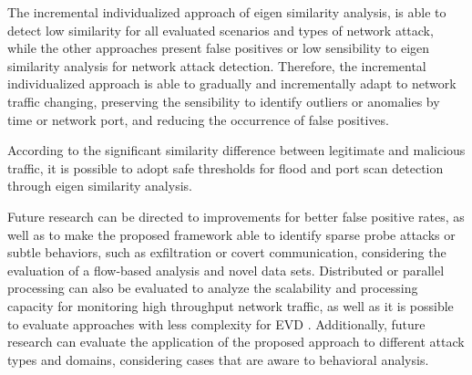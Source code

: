 The incremental individualized approach of eigen similarity analysis, is able to detect low similarity for all evaluated scenarios and types of network attack, while the other approaches present false positives or low sensibility to eigen similarity analysis for network attack detection. Therefore, the incremental individualized approach is able to gradually and incrementally adapt to network traffic changing, preserving the sensibility to identify outliers or anomalies by time or network port, and reducing the occurrence of false positives.

According to the significant similarity difference between legitimate and malicious traffic, it is possible to adopt safe thresholds for flood and port scan detection through eigen similarity analysis.

Future research can be directed to improvements for better false positive rates, as well as to make the proposed framework able to identify sparse probe attacks or subtle behaviors, such as exfiltration or covert communication, considering the evaluation of a flow-based analysis and novel data sets. Distributed or parallel processing can also be evaluated to analyze the scalability and processing capacity for monitoring high throughput network traffic, as well as it is possible to evaluate approaches with less complexity for EVD \cite{halko2011finding}. Additionally, future research can evaluate the application of the proposed approach to different attack types and domains, considering cases that are aware to behavioral analysis.